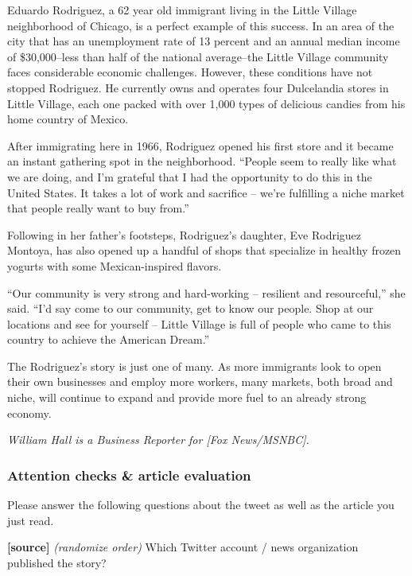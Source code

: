 \documentclass[
]{article}
\begin{document}
Eduardo Rodriguez, a 62 year old immigrant living in the Little Village
neighborhood of Chicago, is a perfect example of this success. In an
area of the city that has an unemployment rate of 13 percent and an
annual median income of \$30,000--less than half of the national
average--the Little Village community faces considerable economic
challenges. However, these conditions have not stopped Rodriguez. He
currently owns and operates four Dulcelandia stores in Little Village,
each one packed with over 1,000 types of delicious candies from his home
country of Mexico.

After immigrating here in 1966, Rodriguez opened his first store and it
became an instant gathering spot in the neighborhood. ``People seem to
really like what we are doing, and I'm grateful that I had the
opportunity to do this in the United States. It takes a lot of work and
sacrifice -- we're fulfilling a niche market that people really want to
buy from.''

Following in her father's footsteps, Rodriguez's daughter, Eve Rodriguez
Montoya, has also opened up a handful of shops that specialize in
healthy frozen yogurts with some Mexican-inspired flavors.

``Our community is very strong and hard-working -- resilient and
resourceful,'' she said. ``I'd say come to our community, get to know
our people. Shop at our locations and see for yourself -- Little Village
is full of people who came to this country to achieve the American
Dream.''

The Rodriguez's story is just one of many. As more immigrants look to
open their own businesses and employ more workers, many markets, both
broad and niche, will continue to expand and provide more fuel to an
already strong economy.

\emph{William Hall is a Business Reporter for {[}Fox News/MSNBC{]}.}

\hypertarget{attention-checks-article-evaluation}{%
\subsubsection{Attention checks \& article
evaluation}\label{attention-checks-article-evaluation}}

Please answer the following questions about the tweet as well as the
article you just read.

\textbf{{[}source{]}} \emph{(randomize order)} Which Twitter account /
news organization published the story?
\end{document}
